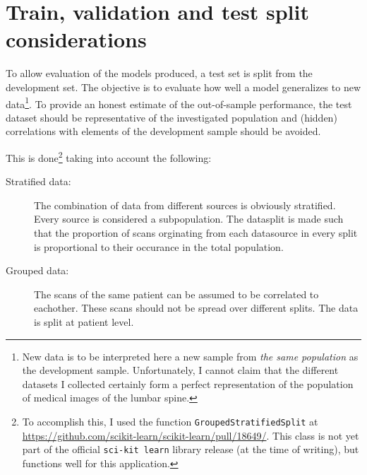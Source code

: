 \section{Train, validation and test split considerations\label{sec:trainValTestSplit}}

To allow evaluation of the models produced, a test set is split from the development set.
The objective is to evaluate how well a model generalizes to new data\footnote{
    New data is to be interpreted here a new sample from \textit{the same population} as the development sample.
    Unfortunately, I cannot claim that the different datasets I collected certainly form a perfect representation of the population of medical images of the lumbar spine.}. 
To provide an honest estimate of the out-of-sample performance, the test dataset should be representative of the investigated population and (hidden) correlations with elements of the development sample should be avoided.

This is done\footnote{
    To accomplish this, I used the function \texttt{GroupedStratifiedSplit} at \url{https://github.com/scikit-learn/scikit-learn/pull/18649/}. 
    This class is not yet part of the official \texttt{sci-kit learn} library release (at the time of writing), but functions well for this application.} taking into account the following:
\begin{description}
    \item[Stratified data:] The combination of data from different sources is obviously stratified. Every source is considered a subpopulation. The datasplit is made such that the proportion of scans orginating from each datasource in every split is proportional to their occurance in the total population.
    \item[Grouped data:] The scans of the same patient can be assumed to be correlated to eachother. These scans should not be spread over different splits. The data is split at patient level.
\end{description}

